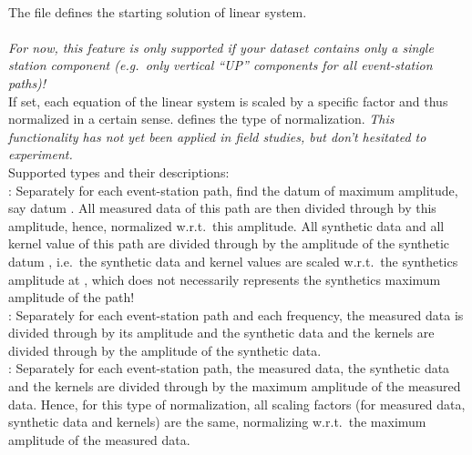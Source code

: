 \paragraph{}
The  file  defines the starting solution of linear system.
\paragraph{}
\emph{For now, this feature is only supported if your dataset contains only a single station component 
(e.g.\ only vertical ``UP'' components for all event-station paths)!}\\
If set, each equation of the linear system is scaled by a specific factor and thus normalized in a certain sense.
 defines the type of normalization. \emph{This 
functionality has not yet been applied in field studies, but don't hesitated to experiment.}\\
Supported types and their descriptions:\\
\textbf{}: Separately for each event-station path, find the datum of maximum amplitude, say
datum . All 
measured data of this path are then divided through by this amplitude, hence, normalized w.r.t.\ this amplitude.
All synthetic data and all kernel value of this path are divided through by the amplitude of the synthetic datum
 , i.e.\ the synthetic data and kernel values are scaled w.r.t.\ the synthetics amplitude at 
, which does not necessarily represents the synthetics maximum amplitude of the path!\\
\textbf{}: Separately for each event-station path and each frequency,
the measured data is divided through by its amplitude and the synthetic data and the kernels are divided through
by the amplitude of the synthetic data.\\
\textbf{}: Separately for each event-station path, the measured data, the synthetic
data and the kernels are divided through by the maximum amplitude of the measured data. Hence, for this type of 
normalization, all scaling factors (for measured data, synthetic data and kernels) are the same, normalizing 
w.r.t.\ the maximum amplitude of the measured data.
